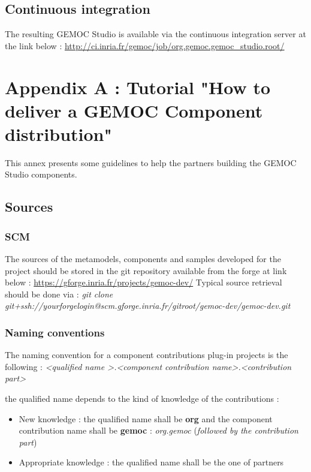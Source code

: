 \documentclass{gemoc} %
\begin{document}
\section{Continuous integration}
The resulting GEMOC Studio is available via the continuous integration server at the link below :
\newline
\url {http://ci.inria.fr/gemoc/job/org.gemoc.gemoc_studio.root/}


\newpage
\chapter{Appendix A : Tutorial "How to deliver a GEMOC Component distribution"}
This annex presents some guidelines to help the partners building the GEMOC Studio components.
\section{Sources}
\subsection{SCM}
The sources of the metamodels, components and samples developed for the project should be stored in the git repository available from the forge at link below :\newline
\url{https://gforge.inria.fr/projects/gemoc-dev/}
\newline\newline
Typical source retrieval should be done via :\newline
\textit{git clone git+ssh://yourforgelogin@scm.gforge.inria.fr/gitroot/gemoc-dev/gemoc-dev.git}
\subsection{Naming conventions}
The naming convention for a component contributions plug-in projects is the following :
\newline
\textit{\textless qualified name \textgreater.\textless component contribution name\textgreater .\textless contribution part\textgreater }
\newline

the qualified name depends to the kind of knowledge of the contributions :
\begin{itemize}
	\item New knowledge : the qualified name shall be \textbf{org} and the component contribution name shall be \textbf{gemoc} : \textit{org.gemoc} (\textit{followed by the contribution part})
	\item Appropriate knowledge : the qualified name shall be the one of partners
\end{itemize}
\end{document}
